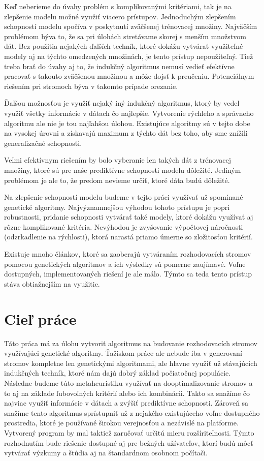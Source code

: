 Keď neberieme do úvahy problém s komplikovanými kritériami, tak je na zlepšenie modelu možné využiť viacero prístupov. Jednoduchým zlepšením schopností modelu spočíva v poskytnutí zväčšenej trénovacej množiny. Najväčším problémom býva to, že sa pri úlohách stretávame skorej s menším množstvom dát. Bez použitia nejakých ďalších techník, ktoré dokážu vytvárať využiteľné modely aj na týchto omedzených množinách, je tento prístup nepoužiteľný. Tiež treba brať do úvahy aj to, že indukčný algoritmus nemusí vedieť efektívne pracovať s takouto zväčšenou množinou a môže dojsť k preučeniu. Potenciálnym riešením pri stromoch býva v takomto prípade orezanie.

Ďalšou možnosťou je využiť nejaký iný indukčný algoritmus, ktorý by vedel využiť všetky informácie v dátach čo najlepšie. Vytvorenie rýchleho a správneho algoritmu ale nie je tou najľahšou úlohou. Existujúce algoritmy sú v tejto dobe na vysokej úrovni a získavajú maximum z týchto dát bez toho, aby sme znížili generalizačné schopnosti.

Veľmi efektívnym riešením by bolo vyberanie len takých dát z trénovacej množiny, ktoré sú pre naše prediktívne schopnosti modelu dôležité. Jediným problémom je ale to, že predom nevieme určiť, ktoré dáta budú dôležité.

Na zlepšenie schopností modelu budeme v tejto práci využívať už spomínané genetické algoritmy. Najvýznamnejšou výhodou tohoto prístupu je popri robustnosti, pridanie schopnosti vytvárať také modely, ktoré dokážu využívať aj rôzne komp\-likované kritéria. Nevýhodou je zvyšovanie výpočtovej náročnosti (odzrkadlenie na rýchlosti), ktorá narastá priamo úmerne so zložitosťou kritérií.

Existuje mnoho článkov, ktoré sa zaoberajú vytváraním rozhodovacích stromov pomocou genetických algoritmov a ich výsledky sú pomerne zaujímavé. Voľne dostupných, implementovaných riešení je ale málo. Týmto sa teda tento prístup stáva obtiažnejším na využitie.
\section{Cieľ práce}
Táto práca má za úlohu vytvoriť algoritmus na budovanie rozhodovacích stromov využívajúci genetické algoritmy. Ťažiskom práce ale nebude iba v generovaní stromov kompletne len genetickými algoritmami, ale hlavne využiť už stávajúcich indukčných techník, ktoré nám dajú dobrý základ počiatočnej populácie. Následne budeme túto metaheuristiku využívať na dooptimalizovanie stromov a to aj na základe ľubovoľných kritérií alebo ich kombinácii. Takto sa snažíme čo najviac využiť informácie v dátach a zvýšiť prediktívne schopnosti. Zároveň sa snažíme tento algoritmus sprístupniť už z nejakého existujúceho voľne dostupného prostredia, ktoré je používané širokou verejnosťou a nezávislé na platforme. Vytvorený program by mal taktiež zaručovať určitú mieru rozšíriteľnosti. Týmto rozhodnutím bude riešenie dostupné aj pre bežných užívateľov, ktorí budú môcť vytvárať výzkumy a štúdia aj na štandardnom osobnom počítači. 

